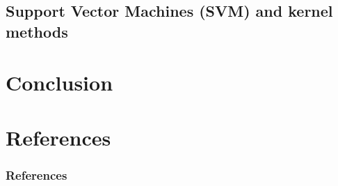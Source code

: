 \documentclass[xcolor=pdftex,dvipsnames,table]{beamer}
\begin{document}
\subsection{Support Vector Machines (SVM) and kernel methods}

\section{Conclusion}


\section{References}
\begin{frame}[allowframebreaks]
	\frametitle{References}
	
\end{frame}
\end{document}
